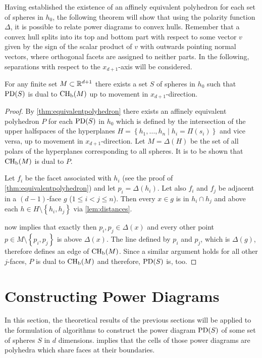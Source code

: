 Having established the existence of an affinely equivalent polyhedron for each set of spheres in $h_0$, the following theorem will show that using the polarity function $\Delta$, it is possible to relate power diagrams to convex hulls.
Remember that a convex hull splits into its top and bottom part with respect to some vector $v$ given by the sign of the scalar product of $v$ with outwards pointing normal vectors, where orthogonal facets are assigned to neither parts.
In the following, separations with respect to the $x_{d+1}$-axis will be considered.
\begin{theorem}
    \label{thm:equivalentconvexhull}
    For any finite set $M \subset \mathbb{R}^{d+1}$ there exists a set $S$ of spheres in $h_0$ such that $\operatorname{PD}(S)$ is dual to $\operatorname{CH_b}(M)$ up to movement in $x_{d+1}$-direction.
\end{theorem}
\begin{proof}
    By \cref{thm:equivalentpolyhedron} there exists an affinely equivalent polyhedron $P$ for each $\operatorname{PD}(S)$ in $h_0$ which is defined by the intersection of the upper halfspaces of the hyperplanes $H = \left\{ h_1, \dots, h_n \mid h_i = \Pi(s_i) \right\}$ and vice versa, up to movement in $x_{d+1}$-direction.
    Let $M = \Delta(H)$ be the set of all polars of the hyperplanes corresponding to all spheres.
    It is to be shown that $\operatorname{CH_b}(M)$ is dual to $P$.

    Let $f_i$ be the facet associated with $h_i$ (see the proof of \cref{thm:equivalentpolyhedron}) and let $p_i = \Delta(h_i)$.
    Let also $f_i$ and $f_j$ be adjacent in a $(d-1)$-face $g$ ($1 \leq i < j \leq n$).
    Then every $x \in g$ is in $h_i \cap h_j$ and above each $h \in H \setminus \left\{ h_i, h_j \right\}$ via \cref{lem:distances}.

     now implies that exactly then $p_i, p_j \in \Delta(x)$ and every other point $p \in M \setminus \left\{ p_i, p_j \right\}$ is above $\Delta(x)$.
    The line defined by $p_i$ and $p_j$, which is $\Delta(g)$, therefore defines an edge of $\operatorname{CH_b}(M)$.
    Since a similar argument holds for all other $j$-faces, $P$ is dual to $\operatorname{CH_b}(M)$ and therefore, $\operatorname{PD}(S)$ is, too.
\end{proof}

\section{Constructing Power Diagrams}
\label{sec:constructing_power_diagrams}
In this section, the theoretical results of the previous sections will be applied to the formulation of algorithms to construct the power diagram $\operatorname{PD}(S)$ of some set of spheres $S$ in $d$ dimensions.
 implies that the cells of those power diagrams are polyhedra which share faces at their boundaries.

